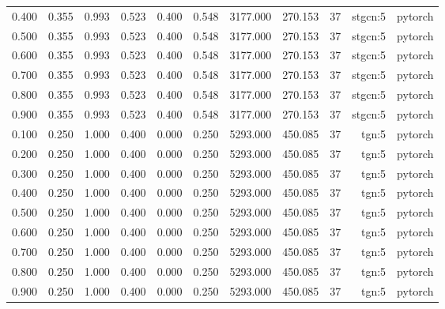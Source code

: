 \begin{tabular}{lrrrrrrrrrr}
0.400 & 0.355 & 0.993 & 0.523 & 0.400 & 0.548 & 3177.000 & 270.153 & 37 & stgcn:5 & pytorch \\
0.500 & 0.355 & 0.993 & 0.523 & 0.400 & 0.548 & 3177.000 & 270.153 & 37 & stgcn:5 & pytorch \\
0.600 & 0.355 & 0.993 & 0.523 & 0.400 & 0.548 & 3177.000 & 270.153 & 37 & stgcn:5 & pytorch \\
0.700 & 0.355 & 0.993 & 0.523 & 0.400 & 0.548 & 3177.000 & 270.153 & 37 & stgcn:5 & pytorch \\
0.800 & 0.355 & 0.993 & 0.523 & 0.400 & 0.548 & 3177.000 & 270.153 & 37 & stgcn:5 & pytorch \\
0.900 & 0.355 & 0.993 & 0.523 & 0.400 & 0.548 & 3177.000 & 270.153 & 37 & stgcn:5 & pytorch \\
0.100 & 0.250 & 1.000 & 0.400 & 0.000 & 0.250 & 5293.000 & 450.085 & 37 & tgn:5 & pytorch \\
0.200 & 0.250 & 1.000 & 0.400 & 0.000 & 0.250 & 5293.000 & 450.085 & 37 & tgn:5 & pytorch \\
0.300 & 0.250 & 1.000 & 0.400 & 0.000 & 0.250 & 5293.000 & 450.085 & 37 & tgn:5 & pytorch \\
0.400 & 0.250 & 1.000 & 0.400 & 0.000 & 0.250 & 5293.000 & 450.085 & 37 & tgn:5 & pytorch \\
0.500 & 0.250 & 1.000 & 0.400 & 0.000 & 0.250 & 5293.000 & 450.085 & 37 & tgn:5 & pytorch \\
0.600 & 0.250 & 1.000 & 0.400 & 0.000 & 0.250 & 5293.000 & 450.085 & 37 & tgn:5 & pytorch \\
0.700 & 0.250 & 1.000 & 0.400 & 0.000 & 0.250 & 5293.000 & 450.085 & 37 & tgn:5 & pytorch \\
0.800 & 0.250 & 1.000 & 0.400 & 0.000 & 0.250 & 5293.000 & 450.085 & 37 & tgn:5 & pytorch \\
0.900 & 0.250 & 1.000 & 0.400 & 0.000 & 0.250 & 5293.000 & 450.085 & 37 & tgn:5 & pytorch \\
\bottomrule
\end{tabular}